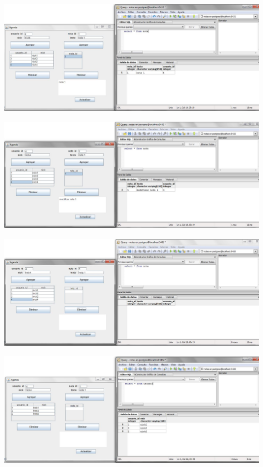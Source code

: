 \documentclass[12pt, oneside]{article}
\begin{document}
\begin{center}
	\includegraphics[height=6cm]{img/app/5.jpg}
	\includegraphics[height=6cm]{img/app/6.jpg}
	\includegraphics[height=6cm]{img/app/7.jpg}
	\includegraphics[height=6cm]{img/app/8.jpg}
\end{center}
\end{document}
